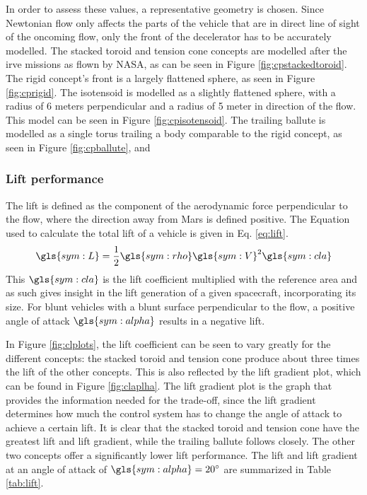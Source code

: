 In order to assess these values, a representative geometry is chosen. Since Newtonian flow only affects the parts of the vehicle that are in direct line of sight of the oncoming flow, only the front of the decelerator has to be accurately modelled. The stacked toroid and tension cone concepts are modelled after the \gls{irve} missions as flown by NASA, as can be seen in Figure \ref{fig:cpstackedtoroid}. The rigid concept's front is a largely flattened sphere, as seen in Figure \ref{fig:cprigid}. The isotensoid is modelled as a slightly flattened sphere, with a radius of 6 meters perpendicular and a radius of 5 meter in direction of the flow. This model can be seen in Figure \ref{fig:cpisotensoid}. The trailing ballute is modelled as a single torus trailing a body comparable to the rigid concept, as seen in Figure \ref{fig:cpballute}, and 



\subsubsection{Lift performance}
The lift is defined as the component of the aerodynamic force perpendicular to the flow, where the direction away from Mars is defined positive. The Equation used to calculate the total lift of a vehicle is given in Eq. \ref{eq:lift}.
\begin{equation}
\gls{sym:L} = \frac{1}{2}\gls{sym:rho}\gls{sym:V}^2\gls{sym:cla}
\label{eq:lift}
\end{equation}
This $\gls{sym:cla}$ is the lift coefficient multiplied with the reference area and as such gives insight in the lift generation of a given spacecraft, incorporating its size. For blunt vehicles with a blunt surface perpendicular to the flow, a positive angle of attack $\gls{sym:alpha}$ results in a negative lift.

In Figure \ref{fig:clplots}, the lift coefficient can be seen to vary greatly for the different concepts: the stacked toroid and tension cone produce about three times the lift of the other concepts. This is also reflected by the lift gradient plot, which can be found in Figure \ref{fig:claplha}. The lift gradient plot is the graph that provides the information needed for the trade-off, since the lift gradient determines how much the control system has to change the angle of attack to achieve a certain lift. It is clear that the stacked toroid and tension cone have the greatest lift and lift gradient, while the trailing ballute follows closely. The other two concepts offer a significantly lower lift performance. The lift and lift gradient at an angle of attack of $\gls{sym:alpha}=20^\circ$ are summarized in Table \ref{tab:lift}.

